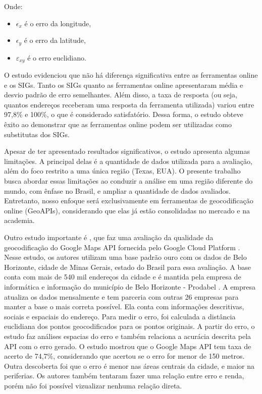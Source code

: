 Onde:
\begin{itemize}
   \item $\epsilon_x$ é o erro da longitude,
   \item $\epsilon_y$ é o erro da latitude,
   \item $\varepsilon_{xy}$ é o erro euclidiano.
\end{itemize}
   
O estudo evidenciou que não há diferença significativa entre as ferramentas online e os SIGs. Tanto os SIGs quanto as ferramentas online apresentaram média e desvio padrão de erro semelhantes. Além disso, a taxa de resposta (ou seja, quantos endereços receberam uma resposta da ferramenta utilizada) variou entre 97,8\% e 100\%, o que é considerado satisfatório. Dessa forma, o estudo obteve êxito ao demonstrar que as ferramentas online podem ser utilizadas como substitutas dos SIGs.

Apesar de \cite{Chow2016} ter apresentado resultados significativos, o estudo apresenta algumas limitações. A principal delas é a quantidade de dados utilizada para a avaliação, além do foco restrito a uma única região (Texas, EUA). O presente trabalho busca abordar essas limitações ao conduzir a análise em uma região diferente do mundo, com ênfase no Brasil, e ampliar a quantidade de dados avaliados. Entretanto, nosso enfoque será exclusivamente em ferramentas de geocodificação online (GeoAPIs), considerando que elas já estão consolidadas no mercado e na academia.

Outro estudo importante é \cite{Clodoveu2011}, que faz uma avaliação da qualidade da geocodificação do Google Maps API fornecida pelo Google Cloud Platform \cite{GCP}. Nesse estudo, os autores utilizam uma base padrão ouro com os dados de Belo Horizonte, cidade de Minas Gerais, estado do Brasil para essa avaliação. A base conta com mais de 540 mil endereços da cidade e é mantida pela empresa de informática e informação do município de Belo Horizonte - Prodabel \cite{Prodabel}. A empresa atualiza os dados mensalmente e tem parceria com outras 26 empresas para manter a base o mais correta possível. Ela conta com informações descritivas, sociais e espaciais do endereço. Para medir o erro, foi calculada a distância euclidiana dos pontos geocodificados para os pontos originais. A partir do erro, o estudo faz análises espacias do erro e também relaciona a acurácia descrita pela API com o erro gerado. O estudo mostrou que o Google Maps API tem taxa de acerto de 74,7\%, considerando que acertou se o erro for menor de 150 metros. Outra descoberta foi que o erro é menor nas áreas centrais da cidade, e maior na periferias. Os autores também tentaram fazer uma relação entre erro e renda, porém não foi possível vizualizar nenhuma relação direta.

